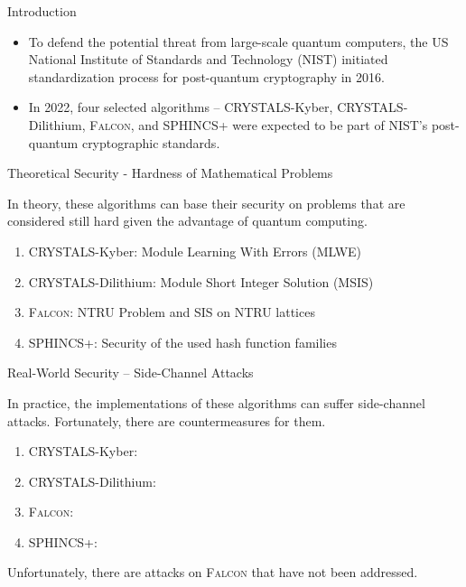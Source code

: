 \begin{frame}{Introduction}

\begin{itemize}
    \item To defend the potential threat from large-scale quantum computers, the US National Institute of Standards and Technology (NIST) initiated standardization process for post-quantum cryptography in 2016.
    \pause
    \item In 2022, four selected algorithms – CRYSTALS-Kyber, CRYSTALS-Dilithium, \textsc{Falcon}, and SPHINCS+ were expected to be part of NIST's post-quantum cryptographic standards.
\end{itemize}
    
\end{frame}


\begin{frame}{Theoretical Security - Hardness of Mathematical Problems}

In theory, these algorithms can base their security on problems that are considered still hard given the advantage of quantum computing.

\begin{enumerate}
    \item CRYSTALS-Kyber: Module Learning With Errors (MLWE)
    \item CRYSTALS-Dilithium: Module Short Integer Solution (MSIS)
    \item \textsc{Falcon}: NTRU Problem and SIS on NTRU lattices
    \item SPHINCS+: Security of the used hash function families
\end{enumerate}

\end{frame}


\begin{frame}{Real-World Security – Side-Channel Attacks}

In practice, the implementations of these algorithms can suffer side-channel attacks. Fortunately, there are countermeasures for them.

\begin{enumerate}
    \item CRYSTALS-Kyber: \cite{TCHES:BGRSv21, TCHES:FBRKSVS22, EPRINT:HKLPSS22}
    \item CRYSTALS-Dilithium: \cite{ACNS:MGTF19}
    \item { \textsc{Falcon}: \cite{PQCRYPTO:HPRR20, TCHES:GMRR22, EC:ZLYW23} }
    \item SPHINCS+: \cite{bertoni2010building,IEEE:7223170}
\end{enumerate}
\pause
\medskip

Unfortunately, there are attacks on \textsc{Falcon} that have not been addressed.

\end{frame}


